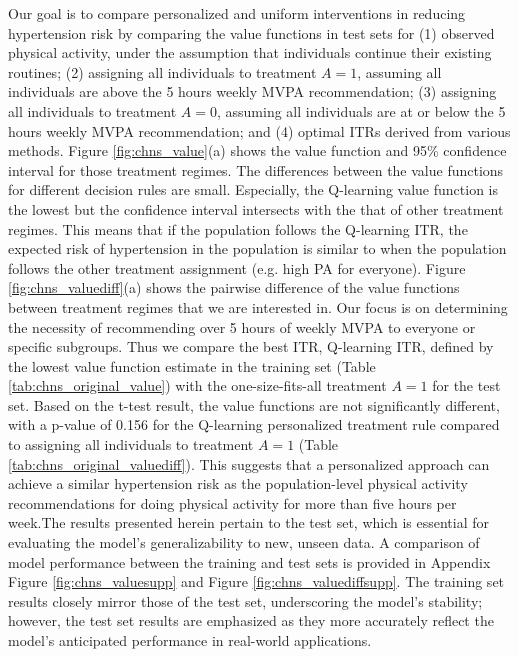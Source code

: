 \documentclass{article}
\begin{document}
Our goal is to compare personalized and uniform interventions in reducing hypertension risk by comparing the value functions in test sets for (1) observed physical activity, under the assumption that individuals continue their existing routines; (2) assigning all individuals to treatment $A=1$, assuming all individuals are above the 5 hours weekly MVPA recommendation; (3) assigning all individuals to treatment $A=0$, assuming all individuals are at or below the 5 hours weekly MVPA recommendation; and (4) optimal ITRs derived from various methods. Figure \ref{fig:chns_value}(a) shows the value function and 95\% confidence interval for those treatment regimes. The differences between the value functions for different decision rules are small. Especially, the Q-learning value function is the lowest but the confidence interval intersects with the that of other treatment regimes. This means that if the population follows the Q-learning ITR, the expected risk of hypertension in the population is similar to when the population follows the other treatment assignment (e.g. high PA for everyone). Figure \ref{fig:chns_valuediff}(a) shows the pairwise difference of the value functions between treatment regimes that we are interested in. Our focus is on determining the necessity of recommending over 5 hours of weekly MVPA to everyone or specific subgroups. Thus we compare the best ITR, Q-learning ITR, defined by the lowest value function estimate in the training set (Table \ref{tab:chns_original_value}) with the one-size-fits-all treatment $A=1$ for the test set. Based on the t-test result, the value functions are not significantly different, with a p-value of 0.156 for the Q-learning personalized treatment rule compared to assigning all individuals to treatment $A=1$ (Table \ref{tab:chns_original_valuediff}). This suggests that a personalized approach can achieve a similar hypertension risk as the population-level physical activity recommendations for doing physical activity for more than five hours per week.The results presented herein pertain to the test set, which is essential for evaluating the model’s generalizability to new, unseen data. A comparison of model performance between the training and test sets is provided in Appendix Figure \ref{fig:chns_valuesupp} and Figure \ref{fig:chns_valuediffsupp}. The training set results closely mirror those of the test set, underscoring the model’s stability; however, the test set results are emphasized as they more accurately reflect the model’s anticipated performance in real-world applications.
\end{document}
